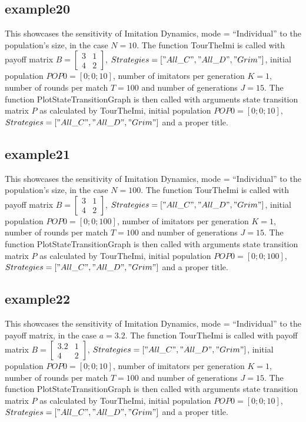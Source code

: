 \subsection{example20}
This showcases the sensitivity of Imitation Dynamics, mode = ``Individual'' to the population's size, in the case $N=10$. The function TourTheImi is called with payoff matrix $B = \begin{bmatrix} 3 & 1 \\ 4 & 2 \end{bmatrix}$, $Strategies = ["All\_C", "All\_D", "Grim"]$, initial population $POP0 = [0; 0; 10]$, number of imitators per generation $K=1$, number of rounds per match $T = 100$ and number of generations $J = 15$. The function PlotStateTransitionGraph is then called with arguments state transition matrix $P$ as calculated by TourTheImi, initial population $POP0 = [0; 0; 10]$, $Strategies = ["All\_C", "All\_D", "Grim"]$ and a proper title.

\subsection{example21}
This showcases the sensitivity of Imitation Dynamics, mode = ``Individual'' to the population's size, in the case $N=100$. The function TourTheImi is called with payoff matrix $B = \begin{bmatrix} 3 & 1 \\ 4 & 2 \end{bmatrix}$, $Strategies = ["All\_C", "All\_D", "Grim"]$, initial population $POP0 = [0; 0; 100]$, number of imitators per generation $K=1$, number of rounds per match $T = 100$ and number of generations $J = 15$. The function PlotStateTransitionGraph is then called with arguments state transition matrix $P$ as calculated by TourTheImi, initial population $POP0 = [0; 0; 100]$, $Strategies = ["All\_C", "All\_D", "Grim"]$ and a proper title.

\subsection{example22}
This showcases the sensitivity of Imitation Dynamics, mode = ``Individual'' to the payoff matrix, in the case $a = 3.2$. The function TourTheImi is called with payoff matrix $B = \begin{bmatrix} 3.2 & 1 \\ 4 & 2 \end{bmatrix}$, $Strategies = ["All\_C", "All\_D", "Grim"]$, initial population $POP0 = [0; 0; 10]$, number of imitators per generation $K=1$, number of rounds per match $T = 100$ and number of generations $J = 15$. The function PlotStateTransitionGraph is then called with arguments state transition matrix $P$ as calculated by TourTheImi, initial population $POP0 = [0; 0; 10]$, $Strategies = ["All\_C", "All\_D", "Grim"]$ and a proper title.

